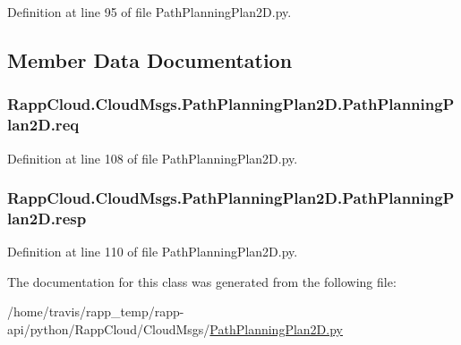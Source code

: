 Definition at line 95 of file Path\-Planning\-Plan2\-D.\-py.



\subsection{Member Data Documentation}
\hypertarget{classRappCloud_1_1CloudMsgs_1_1PathPlanningPlan2D_1_1PathPlanningPlan2D_a73b28f027f8ef617a8298e46058cddc3}{
\subsubsection[{req}]{\setlength{\rightskip}{0pt plus 5cm}Rapp\-Cloud.\-Cloud\-Msgs.\-Path\-Planning\-Plan2\-D.\-Path\-Planning\-Plan2\-D.\-req}}\label{classRappCloud_1_1CloudMsgs_1_1PathPlanningPlan2D_1_1PathPlanningPlan2D_a73b28f027f8ef617a8298e46058cddc3}


Definition at line 108 of file Path\-Planning\-Plan2\-D.\-py.

\hypertarget{classRappCloud_1_1CloudMsgs_1_1PathPlanningPlan2D_1_1PathPlanningPlan2D_a2ad21c77dcd6400ad3658dfaa548377d}{
\subsubsection[{resp}]{\setlength{\rightskip}{0pt plus 5cm}Rapp\-Cloud.\-Cloud\-Msgs.\-Path\-Planning\-Plan2\-D.\-Path\-Planning\-Plan2\-D.\-resp}}\label{classRappCloud_1_1CloudMsgs_1_1PathPlanningPlan2D_1_1PathPlanningPlan2D_a2ad21c77dcd6400ad3658dfaa548377d}


Definition at line 110 of file Path\-Planning\-Plan2\-D.\-py.



The documentation for this class was generated from the following file\-:\begin{DoxyCompactItemize}
\item 
/home/travis/rapp\-\_\-temp/rapp-\/api/python/\-Rapp\-Cloud/\-Cloud\-Msgs/\hyperlink{PathPlanningPlan2D_8py}{Path\-Planning\-Plan2\-D.\-py}\end{DoxyCompactItemize}
